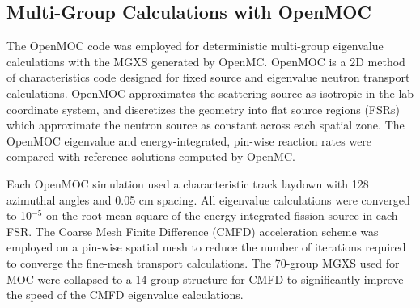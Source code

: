 \subsection{Multi-Group Calculations with OpenMOC}
\label{subsec:openmoc}

The OpenMOC code was employed for deterministic multi-group eigenvalue calculations with the MGXS generated by OpenMC. OpenMOC is a 2D method of characteristics code designed for fixed source and eigenvalue neutron transport calculations. OpenMOC approximates the scattering source as isotropic in the lab coordinate system, and discretizes the geometry into flat source regions (FSRs) which approximate the neutron source as constant across each spatial zone. The OpenMOC eigenvalue and energy-integrated, pin-wise reaction rates were compared with reference solutions computed by OpenMC.

Each OpenMOC simulation used a characteristic track laydown with 128 azimuthal angles and 0.05 cm spacing. All eigenvalue calculations were converged to 10$^{-5}$ on the root mean square of the energy-integrated fission source in each FSR. The Coarse Mesh Finite Difference (CMFD) acceleration scheme was employed on a pin-wise spatial mesh to reduce the number of iterations required to converge the fine-mesh transport calculations. The 70-group MGXS used for MOC were collapsed to a 14-group structure for CMFD to significantly improve the speed of the CMFD eigenvalue calculations.
